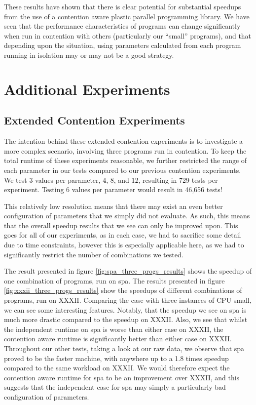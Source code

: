 These results have shown that there is clear potential for substantial speedups from the use of a contention aware plastic parallel programming library. We have seen that the performance characteristics of programs can change significantly when run in contention with others (particularly our ``small'' programs), and that depending upon the situation, using parameters calculated from each program running in isolation may or may not be a good strategy.



\section{Additional Experiments}
\label{section:results:additional_experiments}

\subsection{Extended Contention Experiments}
\label{section:results:extended_contention_experiments}

The intention behind these extended contention experiments is to investigate a more complex scenario, involving three programs run in contention. To keep the total runtime of these experiments reasonable, we further restricted the range of each parameter in our tests compared to our previous contention experiments. We test 3 values per parameter, 4, 8, and 12, resulting in 729 tests per experiment. Testing 6 values per parameter would result in 46,656 tests!

This relatively low resolution means that there may exist an even better configuration of parameters that we simply did not evaluate. As such, this means that the overall speedup results that we see can only be improved upon. This goes for all of our experiments, as in each case, we had to sacrifice some detail due to time constraints, however this is especially applicable here, as we had to significantly restrict the number of combinations we tested.

The result presented in figure \ref{fig:spa_three_progs_results} shows the speedup of one combination of programs, run on spa. The results presented in figure \ref{fig:xxxii_three_progs_results} show the speedups of different combinations of programs, run on XXXII. Comparing the case with three instances of CPU small, we can see some interesting features. Notably, that the speedup we see on spa is much more drastic compared to the speedup on XXXII. Also, we see that whilst the independent runtime on spa is worse than either case on XXXII, the contention aware runtime is significantly better than either case on XXXII. Throughout our other tests, taking a look at our raw data, we observe that spa proved to be the faster machine, with anywhere up to a 1.8 times speedup compared to the same workload on XXXII. We would therefore expect the contention aware runtime for spa to be an improvement over XXXII, and this suggests that the independent case for spa may simply a particularly bad configuration of parameters.

